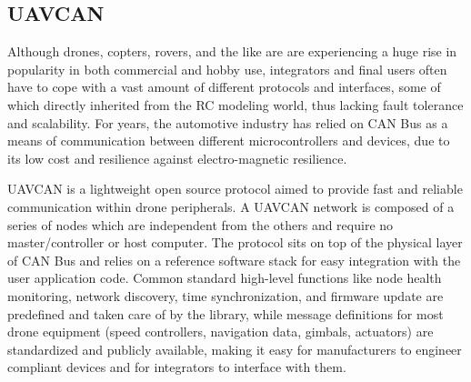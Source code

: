 \subsection{UAVCAN}

Although drones, copters, rovers, and the like are are experiencing a huge rise in popularity in both commercial and hobby use, integrators and final users often have to cope with a vast amount of different protocols and interfaces, some of which directly inherited from the RC modeling world, thus lacking fault tolerance and scalability.
For years, the automotive industry has relied on CAN Bus as a means of communication between different microcontrollers and devices, due to its low cost and resilience against electro-magnetic resilience.

UAVCAN is a lightweight open source protocol aimed to provide fast and reliable communication within drone peripherals. \cite{can}
A UAVCAN network is composed of a series of nodes which are independent from the others and require no master/controller or host computer.
The protocol sits on top of the physical layer of CAN Bus and relies on a reference software stack for easy integration with the user application code.
Common standard high-level functions like node health monitoring, network discovery, time synchronization, and firmware update are predefined and taken care of by the library, while  message definitions for most drone equipment (speed controllers, navigation data, gimbals, actuators) are standardized and publicly available, making it easy for manufacturers to engineer compliant devices and for integrators to interface with them.
